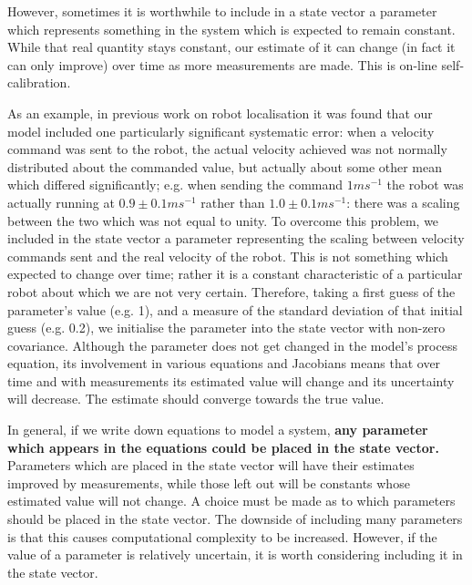 \documentclass{article}
\begin{document}
However, sometimes it is worthwhile to include in a state vector a
parameter which represents something in the system which is expected
to remain constant. While that real quantity stays constant, our
estimate of it can change (in fact it can only improve) over time as
more measurements are made. This is on-line self-calibration.

As an example, in previous work on robot localisation it was found
that our model included one particularly significant systematic error:
when a velocity command was sent to the robot, the actual velocity
achieved was not normally distributed about the commanded value, but
actually about some other mean which differed significantly; e.g. when
sending the command $1ms^{-1}$ the robot was actually running at $0.9
\pm 0.1 ms^{-1}$ rather than $1.0 \pm 0.1 ms^{-1}$: there was a
scaling between the two which was not equal to unity. To overcome this
problem, we included in the state vector a parameter representing the
scaling between velocity commands sent and the real velocity of the
robot. This is not something which expected to change over time;
rather it is a constant characteristic of a particular robot about
which we are not very certain. Therefore, taking a first guess of the
parameter's value (e.g. 1), and a measure of the standard deviation of
that initial guess (e.g. 0.2), we initialise the parameter into the
state vector with non-zero covariance. Although the parameter does not
get changed in the model's process equation, its involvement in
various equations and Jacobians means that over time and with
measurements its estimated value will change and its uncertainty will
decrease. The estimate should converge towards the true value.

In general, if we write down equations to model a system, {\bf any
  parameter which appears in the equations could be placed in the
  state vector.}  Parameters which are placed in the state vector will
have their estimates improved by measurements, while those left out
will be constants whose estimated value will not change. A choice must
be made as to which parameters should be placed in the state
vector. The downside of including many parameters is that this causes
computational complexity to be increased. However, if the value of a
parameter is relatively uncertain, it is worth considering including
it in the state vector.
\end{document}
